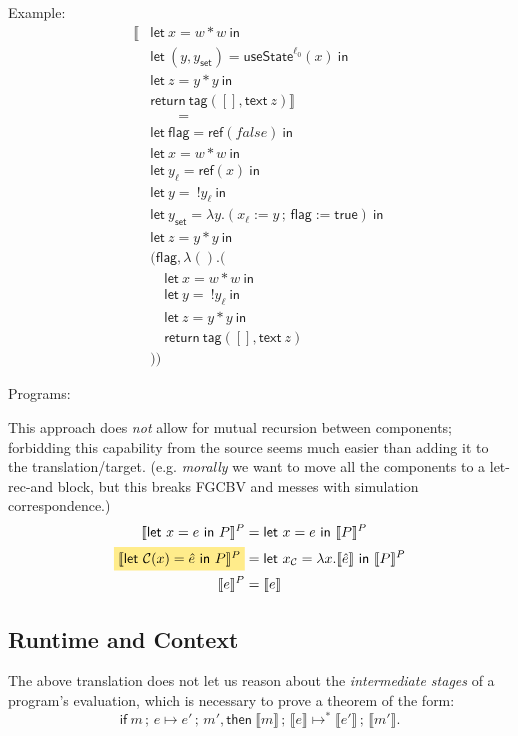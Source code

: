 \documentclass{article}
\newcommand{\mf}[1]{\mathsf{#1}}
\newcommand{\mc}[1]{\mathcal{#1}}
\newcommand{\semi}{\,;\,}
\newcommand{\mhl}[1]{\colorbox{LightGoldenrod1}{$#1$}}
\newcommand{\llrr}[1]{\llbracket #1 \rrbracket}
\newcommand{\C}{\mc{C}}
\newcommand{\vtxt}[1]{\mf{text}\ #1}
\newcommand{\vtag}[2]{\mf{tag}(#1, #2)}
\newcommand{\elet}[3]{\mf{let}\ #1 = #2\ \mf{in}\ #3}
\newcommand{\eret}[1]{\mf{return}\ #1}
\newcommand{\estate}[4]{\mf{let}\ (#1, #1_{\mf{set}}) = \mf{useState}^{#2}(#3)\ \mf{in}\ #4}
\newcommand{\eref}[1]{\mf{ref}(#1)}
\newcommand{\eget}[1]{\ !#1}
\newcommand{\eset}[2]{#1 := #2}
\begin{document}
Example:
\begin{align*}
\llrr{
  &\elet{x}{w * w}{\\
    &\estate{y}{\ell_0}{x}{\\
      &\elet{z}{y * y}{\\
          &\eret{\vtag{[]}{\vtxt{z}}}
      }
    }
  }
}\\
&\qquad=\\
&\elet{\mf{flag}}{\eref{false}}{\\
  &\elet{x}{w * w}{\\
    &\elet{y_\ell}{\eref{x}}{\\
      &\elet{y}{\eget{y_\ell}}{\\
        &\elet{y_\mf{set}}{\lambda y.(\eset{x_\ell}{y} 
    \semi \eset{\mf{flag}}{\mf{true}})}{\\
          &\elet{z}{y * y}{\\
            &(\mf{flag}, \lambda ().(\\
              &\quad\elet{x}{w * w}{\\
                &\quad\elet{y}{\eget{y_\ell}}{\\
                  &\quad\elet{z}{y * y}{\\
                    &\quad\eret{\vtag{[]}{\vtxt{z}}}\\
                  }
                }
              }
            &))
          }
        }
      }
    }
  }
}
\end{align*}

Programs:

This approach does \emph{not} allow for 
mutual recursion between components;
forbidding this capability from the source seems much easier
than adding it to the translation/target.
(e.g. \emph{morally} we want to move all the components 
to a let-rec-and block,
but this breaks FGCBV and messes with simulation correspondence.)
\begin{align*}
\llrr{\elet{x}{e}{P}}^P &= \elet{x}{e}{\llrr{P}^P}\\
\mhl{\llrr{\elet{\C(x)}{\hat{e}}{P}}^P} &=
\elet{x_\C}{\lambda x.\llrr{\hat{e}}}{\llrr{P}^P}\\
\llrr{e}^P &= \llrr{e}
\end{align*}

\subsection{Runtime and Context}

The above translation does not let us reason about the
\emph{intermediate stages} of a program's evaluation,
which is necessary to prove a theorem of the form:
$$\mf{if}\ m \semi e \mapsto e' \semi m'
\mf{, then}\ \llrr{m} \semi \llrr{e} \mapsto^* \llrr{e'} \semi \llrr{m'}.$$
\end{document}
